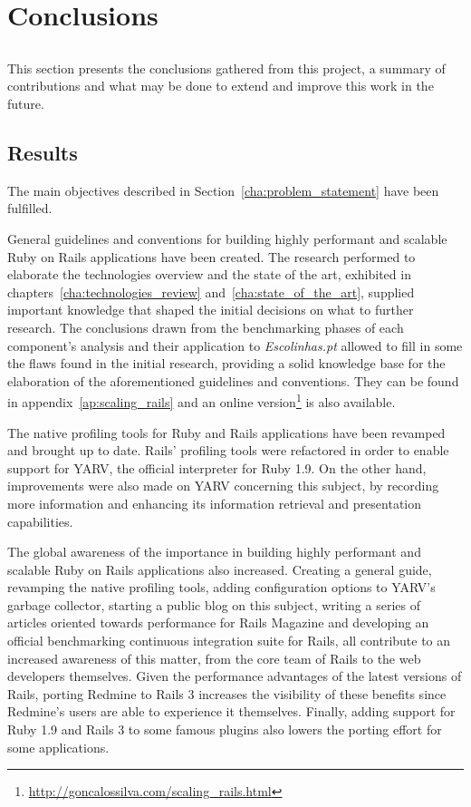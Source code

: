 \chapter{Conclusions} %
\label{cha:conclusions}
\section*{} %
This section presents the conclusions gathered from this project, a summary of contributions and what may be done to extend and improve this work in the future.

\section{Results}
The main objectives described in Section~\ref{cha:problem_statement} have been fulfilled.

General guidelines and conventions for building highly performant and scalable Ruby on Rails applications have been created. The research performed to elaborate the technologies overview and the state of the art, exhibited in chapters~\ref{cha:technologies_review} and~\ref{cha:state_of_the_art}, supplied important knowledge that shaped the initial decisions on what to further research. The conclusions drawn from the benchmarking phases of each component's analysis and their application to \textit{Escolinhas.pt} allowed to fill in some the flaws found in the initial research, providing a solid knowledge base for the elaboration of the aforementioned guidelines and conventions. They can be found in appendix~\ref{ap:scaling_rails} and an online version\footnote{\url{http://goncalossilva.com/scaling_rails.html}} is also available.

The native profiling tools for Ruby and Rails applications have been revamped and brought up to date. Rails' profiling tools were refactored in order to enable support for YARV, the official interpreter for Ruby 1.9. On the other hand, improvements were also made on YARV concerning this subject, by recording more information and enhancing its information retrieval and presentation capabilities.

The global awareness of the importance in building highly performant and scalable Ruby on Rails applications also increased. Creating a general guide, revamping the native profiling tools, adding configuration options to YARV's garbage collector, starting a public blog on this subject, writing a series of articles oriented towards performance for Rails Magazine and developing an official benchmarking continuous integration suite for Rails, all contribute to an increased awareness of this matter, from the core team of Rails to the web developers themselves. Given the performance advantages of the latest versions of Rails, porting Redmine to Rails 3 increases the visibility of these benefits since Redmine's users are able to experience it themselves. Finally, adding support for Ruby 1.9 and Rails 3 to some famous plugins also lowers the porting effort for some applications.


